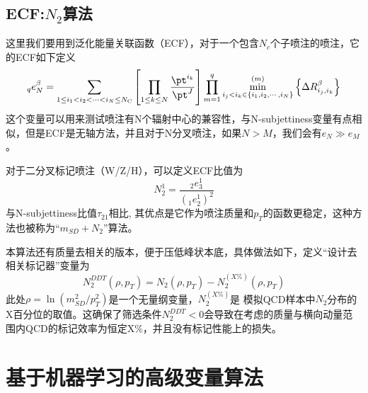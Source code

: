 \subsection{ECF:$N_2$算法}
这里我们要用到泛化能量关联函数（ECF），对于一个包含$N_c$个子喷注的喷注，它的ECF如下定义
\begin{equation}
    {}_{q}e_{N}^{\beta}=\sum_{1\leq i_{1}<i_{2}<\cdots<i_{N}\leq N_{\text{C}}}%
\left[\prod_{1\leq k\leq N}\frac{\pt^{i_{k}}}{\pt^{J}}\right]\prod_{m=1}^{q}%
\min_{i_{j}<i_{k}\in\{i_{1},i_{2},\cdots,i_{N}\}}^{(m)}\left\{\Delta R_{i_{j},%
i_{k}}^{\beta}\right\}
\end{equation}
这个变量可以用来测试喷注有N个辐射中心的兼容性，与N-subjettiness变量有点相似，但是ECF是无轴方法，并且对于N分叉喷注，如果$N>M$，我们会有$e_N\gg e_M$。

对于二分叉标记喷注（W/Z/H），可以定义ECF比值为
\begin{equation}
    N_{2}^{1}=\frac{{}_{2}e_{3}^{1}}{(_{1}e_{2}^{1})^{2}}
\end{equation}
与N-subjettiness比值$\tau_{21}$相比, 其优点是它作为喷注质量和$p_T$的函数更稳定，这种方法也被称为“$m_{SD}+N_2$”算法。

本算法还有质量去相关的版本，便于压低峰状本底，具体做法如下，定义“设计去相关标记器”变量为
\begin{equation}
    N_2^{DDT}(\rho,p_T)=N_2(\rho, p_T)-N_2^{(X\%)}(\rho,p_T)
\end{equation}
此处$\rho=\ln{(m_{SD}^2/p_T^2)}$是一个无量纲变量，$N_2^{(X\%)}$是
模拟QCD样本中$N_2$分布的X百分位的取值。这确保了筛选条件$N^{DDT}_2<0$会导致在考虑的质量与横向动量范围内QCD的标记效率为恒定X\%，并且没有标记性能上的损失。

\section{基于机器学习的高级变量算法}
